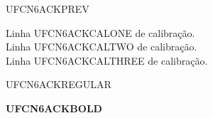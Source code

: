 \documentclass{abntexto-ufc}
\begin{document}
\pretextual

\thispagestyle{empty}
UFCN6ACKPREV
\vfill


\thispagestyle{empty}
\begingroup
\onehalfsp
Linha UFCN6ACKCALONE de calibração.\\
Linha UFCN6ACKCALTWO de calibração.\\
Linha UFCN6ACKCALTHREE de calibração.
\par
\vspace{2\baselineskip}
UFCN6ACKREGULAR\par
{\bfseries UFCN6ACKBOLD\par}
\endgroup
\end{document}
